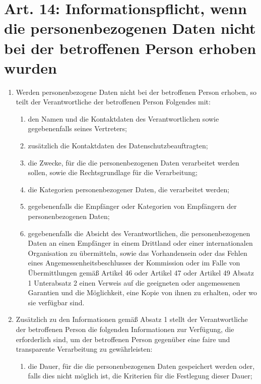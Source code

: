     \section[Art. 14: Informationspflicht]{Art. 14: Informationspflicht, wenn die personenbezogenen Daten nicht bei der betroffenen Person
erhoben wurden}
    \begin{enumerate}[label=(\arabic*)]
        \item Werden personenbezogene Daten nicht bei der betroffenen Person erhoben, so teilt der Verantwortliche der betroffenen Person Folgendes mit:
            \begin{enumerate}[label=\alph*)]
                \item den Namen und die Kontaktdaten des Verantwortlichen sowie gegebenenfalls seines Vertreters;
                \item zusätzlich die Kontaktdaten des Datenschutzbeauftragten;
                \item die Zwecke, für die die personenbezogenen Daten verarbeitet werden sollen, sowie die Rechtsgrundlage für die
Verarbeitung;
                \item die Kategorien personenbezogener Daten, die verarbeitet werden;
                \item gegebenenfalls die Empfänger oder Kategorien von Empfängern der personenbezogenen Daten;
                \item gegebenenfalls die Absicht des Verantwortlichen, die personenbezogenen Daten an einen Empfänger in einem Drittland oder einer internationalen Organisation zu übermitteln, sowie das Vorhandensein oder das Fehlen eines Angemessenheitsbeschlusses der Kommission oder im Falle von Übermittlungen gemäß Artikel 46 oder Artikel 47 oder Artikel 49 Absatz 1 Unterabsatz 2 einen Verweis auf die geeigneten oder angemessenen Garantien und die Möglichkeit, eine Kopie von ihnen zu erhalten, oder wo sie verfügbar sind. 
            \end{enumerate}
        \item Zusätzlich zu den Informationen gemäß Absatz 1 stellt der Verantwortliche der betroffenen Person die folgenden Informationen zur Verfügung, die erforderlich sind, um der betroffenen Person gegenüber eine faire und transparente Verarbeitung zu gewährleisten:
            \begin{enumerate}[label=\alph*)]
                \item die Dauer, für die die personenbezogenen Daten gespeichert werden oder, falls dies nicht möglich ist, die Kriterien für die Festlegung dieser Dauer;

\end{enumerate}
\end{enumerate}
